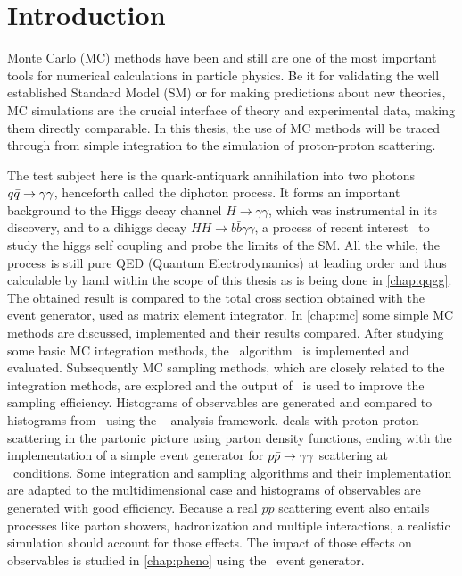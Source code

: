 \chapter{Introduction}%
\label{chap:intro}

Monte Carlo (MC) methods have been and still are one of the most
important tools for numerical calculations in particle physics. Be it
for validating the well established Standard Model (SM) or for making
predictions about new theories, MC simulations are the crucial
interface of theory and experimental data, making them directly
comparable.
In this thesis, the use of MC methods will be traced through from
simple integration to the simulation of proton-proton scattering.

The test subject here is the quark-antiquark annihilation into two
photons \(q\bar{q}\rightarrow\gamma\gamma\), henceforth called the diphoton process. It forms an
important background to the Higgs decay channel
\(H\rightarrow \gamma\gamma\), which was instrumental in its
discovery, and to a dihiggs decay
\(HH\rightarrow b\bar{b}\gamma\gamma\), a process of recent
interest~\cite{aaboud2018:sf} to study the higgs self coupling and
probe the limits of the SM. All the while, the process is still pure
QED (Quantum Electrodynamics) at leading order and thus calculable by
hand within the scope of this thesis as is being done in
\cref{chap:qqgg}. The obtained result is compared to the total cross
section obtained with the \sherpa~\cite{Gleisberg:2008ta} event
generator, used as matrix element integrator. In \cref{chap:mc} some
simple MC methods are discussed, implemented and their results
compared. After studying some basic MC integration methods, the
\vegas\ algorithm~\cite{Lepage:19781an} is implemented and
evaluated. Subsequently MC sampling methods, which are closely related
to the integration methods, are explored and the output of \vegas\ is
used to improve the sampling efficiency. Histograms of observables are
generated and compared to histograms from \sherpa\ using the
\rivet~\cite{Bierlich:2019rhm} analysis framework. 
deals with proton-proton scattering in the partonic picture using
parton density functions, ending with the implementation of a simple
event generator for \(p\bar{p}\rightarrow\gamma\gamma\) scattering at \lhc\ conditions. Some
integration and sampling algorithms and their implementation are
adapted to the multidimensional case and histograms of observables are
generated with good efficiency. Because a real \(pp\) scattering event
also entails processes like parton showers, hadronization and multiple
interactions, a realistic simulation should account for those
effects. The impact of those effects on observables is studied in
\cref{chap:pheno} using the \sherpa\ event generator.

